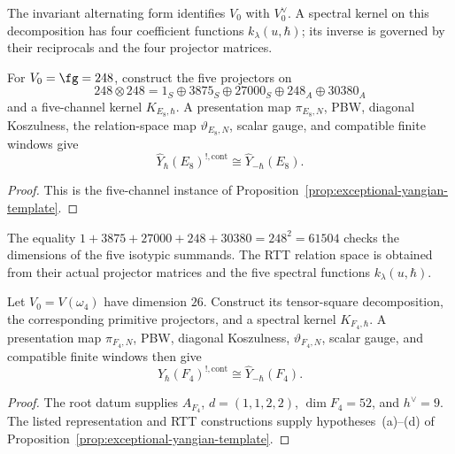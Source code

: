 \begin{remark}
\label{rem:exceptional-yangian-E7-self-dual}
The invariant alternating form identifies $V_0$ with $V_0^\vee$.
A spectral kernel on this decomposition has four coefficient functions
$k_\lambda(u,\hbar)$; its inverse is governed by their reciprocals and
the four projector matrices.
\end{remark}

\begin{proposition}
\label{prop:exceptional-yangian-koszul-E8}
For $V_0=\fg=248$, construct the five projectors on
\[
248\otimes248
=1_S\oplus3875_S\oplus27000_S\oplus248_A\oplus30380_A
\]
and a five-channel kernel $K_{E_8,\hbar}$.  A presentation map
$\pi_{E_8,N}$, PBW, diagonal Koszulness, the relation-space map
$\vartheta_{E_8,N}$, scalar gauge, and compatible finite windows give
\[
\widehat Y_\hbar(E_8)^{!,\mathrm{cont}}
\cong\widehat Y_{-\hbar}(E_8).
\]
\end{proposition}

\begin{proof}
This is the five-channel instance of
Proposition~\ref{prop:exceptional-yangian-template}.
\end{proof}

\begin{remark}
\label{rem:exceptional-yangian-E8-adjoint}
The equality
$1+3875+27000+248+30380=248^2=61504$
checks the dimensions of the five isotypic summands.  The RTT relation
space is obtained from their actual projector matrices and the five
spectral functions $k_\lambda(u,\hbar)$.
\end{remark}

\begin{proposition}
\label{prop:exceptional-yangian-koszul-F4}
Let $V_0=V(\omega_4)$ have dimension $26$.  Construct its tensor-square
decomposition, the corresponding primitive projectors, and a spectral
kernel $K_{F_4,\hbar}$.  A presentation map $\pi_{F_4,N}$, PBW,
diagonal Koszulness, $\vartheta_{F_4,N}$, scalar gauge, and compatible
finite windows then give
\[
\widehat Y_\hbar(F_4)^{!,\mathrm{cont}}
\cong\widehat Y_{-\hbar}(F_4).
\]
\end{proposition}

\begin{proof}
The root datum supplies $A_{F_4}$, $d=(1,1,2,2)$,
$\dim F_4=52$, and $h^\vee=9$.  The listed representation and RTT
constructions supply hypotheses~\textup{(a)}--\textup{(d)} of
Proposition~\ref{prop:exceptional-yangian-template}.
\end{proof}

